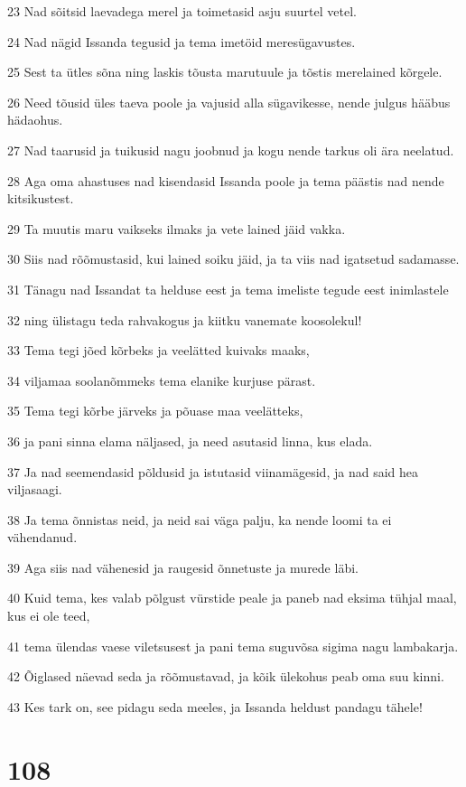 \par 23 Nad sõitsid laevadega merel ja toimetasid asju suurtel vetel.
\par 24 Nad nägid Issanda tegusid ja tema imetöid meresügavustes.
\par 25 Sest ta ütles sõna ning laskis tõusta marutuule ja tõstis merelained kõrgele.
\par 26 Need tõusid üles taeva poole ja vajusid alla sügavikesse, nende julgus hääbus hädaohus.
\par 27 Nad taarusid ja tuikusid nagu joobnud ja kogu nende tarkus oli ära neelatud.
\par 28 Aga oma ahastuses nad kisendasid Issanda poole ja tema päästis nad nende kitsikustest.
\par 29 Ta muutis maru vaikseks ilmaks ja vete lained jäid vakka.
\par 30 Siis nad rõõmustasid, kui lained soiku jäid, ja ta viis nad igatsetud sadamasse.
\par 31 Tänagu nad Issandat ta helduse eest ja tema imeliste tegude eest inimlastele
\par 32 ning ülistagu teda rahvakogus ja kiitku vanemate koosolekul!
\par 33 Tema tegi jõed kõrbeks ja veelätted kuivaks maaks,
\par 34 viljamaa soolanõmmeks tema elanike kurjuse pärast.
\par 35 Tema tegi kõrbe järveks ja põuase maa veelätteks,
\par 36 ja pani sinna elama näljased, ja need asutasid linna, kus elada.
\par 37 Ja nad seemendasid põldusid ja istutasid viinamägesid, ja nad said hea viljasaagi.
\par 38 Ja tema õnnistas neid, ja neid sai väga palju, ka nende loomi ta ei vähendanud.
\par 39 Aga siis nad vähenesid ja raugesid õnnetuste ja murede läbi.
\par 40 Kuid tema, kes valab põlgust vürstide peale ja paneb nad eksima tühjal maal, kus ei ole teed,
\par 41 tema ülendas vaese viletsusest ja pani tema suguvõsa sigima nagu lambakarja.
\par 42 Õiglased näevad seda ja rõõmustavad, ja kõik ülekohus peab oma suu kinni.
\par 43 Kes tark on, see pidagu seda meeles, ja Issanda heldust pandagu tähele!

\chapter{108}

